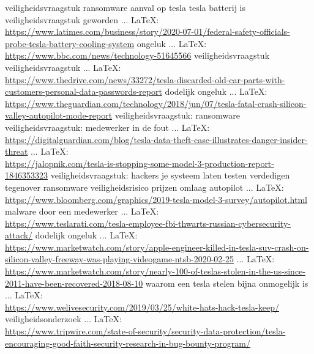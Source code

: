 \begin{thebibliography}{99}
{{{{veiligheidsvraagstuk
ransomware aanval op tesla
tesla batterij is veiligheidsvraagstuk geworden
 ... \LaTeX:\\ \url{https://www.latimes.com/business/story/2020-07-01/federal-safety-officials-probe-tesla-battery-cooling-system}
ongeluk
 ... \LaTeX:\\ \url{https://www.bbc.com/news/technology-51645566}
veiligheidsvraagstuk
veiligheidsvraagstuk
 ... \LaTeX:\\ \url{https://www.thedrive.com/news/33272/tesla-discarded-old-car-parts-with-customers-personal-data-passwords-report}
dodelijk ongeluk
 ... \LaTeX:\\ \url{https://www.theguardian.com/technology/2018/jun/07/tesla-fatal-crash-silicon-valley-autopilot-mode-report}
veiligheidsvraagstuk: ransomware
veiligheidsvraagstuk: medewerker in de fout
 ... \LaTeX:\\ \url{https://digitalguardian.com/blog/tesla-data-theft-case-illustrates-danger-insider-threat}
 ... \LaTeX:\\ \url{https://jalopnik.com/tesla-is-stopping-some-model-3-production-report-1846353323}
veiligheidsvraagstuk: hackers je systeem laten testen
verdedigen tegenover ransomware
veiligheidsrisico
prijzen omlaag
autopilot
 ... \LaTeX:\\ \url{https://www.bloomberg.com/graphics/2019-tesla-model-3-survey/autopilot.html}
malware door een medewerker
 ... \LaTeX:\\ \url{https://www.teslarati.com/tesla-employee-fbi-thwarts-russian-cybersecurity-attack/}
dodelijk ongeluk
 ... \LaTeX:\\ \url{https://www.marketwatch.com/story/apple-engineer-killed-in-tesla-suv-crash-on-silicon-valley-freeway-was-playing-videogame-ntsb-2020-02-25}
 ... \LaTeX:\\ \url{https://www.marketwatch.com/story/nearly-100-of-teslas-stolen-in-the-us-since-2011-have-been-recovered-2018-08-10}
waarom een tesla stelen bijna onmogelijk is
 ... \LaTeX:\\ \url{https://www.welivesecurity.com/2019/03/25/white-hats-hack-tesla-keep/}
veiligheidsonderzoek
 ... \LaTeX:\\ \url{https://www.tripwire.com/state-of-security/security-data-protection/tesla-encouraging-good-faith-security-research-in-bug-bounty-program/}
}}}}
\end{thebibliography}
